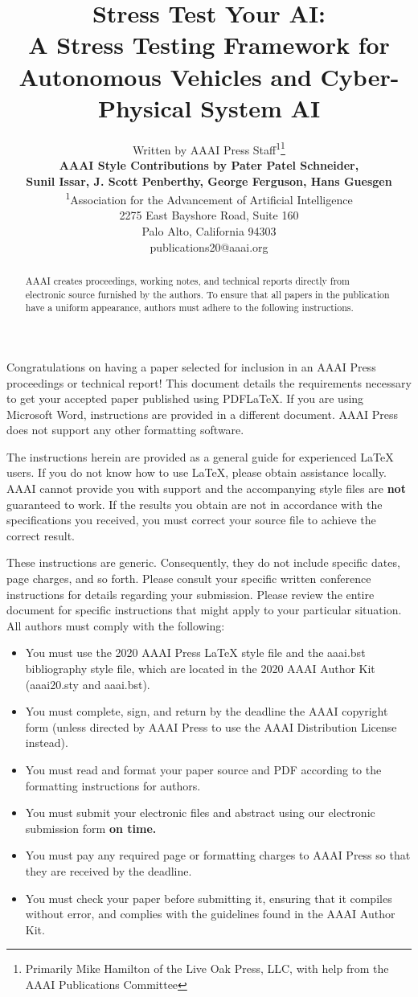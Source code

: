 \documentclass[letterpaper]{article} %
\title{Stress Test Your AI: \\A Stress Testing Framework for \\Autonomous Vehicles and Cyber-Physical System AI}
\author{Written by AAAI Press Staff\textsuperscript{\rm 1}\thanks{Primarily Mike Hamilton of the Live Oak Press, LLC, with help from the AAAI Publications Committee}\\ \Large \textbf{AAAI Style Contributions by
Pater Patel Schneider,} \\ \Large \textbf{Sunil Issar, J. Scott Penberthy, George Ferguson, Hans Guesgen}\\ %
\textsuperscript{\rm 1}Association for the Advancement of Artificial Intelligence\\ %
2275 East Bayshore Road, Suite 160\\
Palo Alto, California 94303\\
publications20@aaai.org %
}
\begin{document}
\maketitle

\begin{abstract}
AAAI creates proceedings, working notes, and technical reports directly from electronic source furnished by the authors. To ensure that all papers in the publication have a uniform appearance, authors must adhere to the following instructions. 
\end{abstract}

\noindent Congratulations on having a paper selected for inclusion in an AAAI Press proceedings or technical report! This document details the requirements necessary to get your accepted paper published using PDF\LaTeX{}. If you are using Microsoft Word, instructions are provided in a different document. AAAI Press does not support any other formatting software. 

The instructions herein are provided as a general guide for experienced \LaTeX{} users. If you do not know how to use \LaTeX{}, please obtain assistance locally. AAAI cannot provide you with support and the accompanying style files are \textbf{not} guaranteed to work. If the results you obtain are not in accordance with the specifications you received, you must correct your source file to achieve the correct result. 

These instructions are generic. Consequently, they do not include specific dates, page charges, and so forth. Please consult your specific written conference instructions for details regarding your submission. Please review the entire document for specific instructions that might apply to your particular situation. All authors must comply with the following:

\begin{itemize}
\item You must use the 2020 AAAI Press \LaTeX{} style file and the aaai.bst bibliography style file, which are located in the 2020 AAAI Author Kit (aaai20.sty and aaai.bst).
\item You must complete, sign, and return by the deadline the AAAI copyright form (unless directed by AAAI Press to use the AAAI Distribution License instead).
\item You must read and format your paper source and PDF according to the formatting instructions for authors.
\item You must submit your electronic files and abstract using our electronic submission form \textbf{on time.}
\item You must pay any required page or formatting charges to AAAI Press so that they are received by the deadline.
\item You must check your paper before submitting it, ensuring that it compiles without error, and complies with the guidelines found in the AAAI Author Kit.
\end{itemize}
\end{document}
